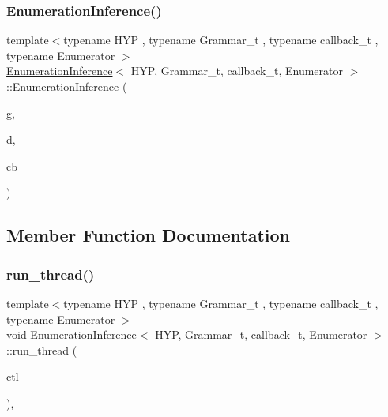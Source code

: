 \subsubsection{\texorpdfstring{Enumeration\+Inference()}{EnumerationInference()}}
{\footnotesize\ttfamily template$<$typename H\+YP , typename Grammar\+\_\+t , typename callback\+\_\+t , typename Enumerator $>$ \\
\hyperlink{class_enumeration_inference}{Enumeration\+Inference}$<$ H\+YP, Grammar\+\_\+t, callback\+\_\+t, Enumerator $>$\+::\hyperlink{class_enumeration_inference}{Enumeration\+Inference} (\begin{DoxyParamCaption}\item[{Grammar\+\_\+t $\ast$}]{g,  }\item[{typename H\+Y\+P\+::data\+\_\+t $\ast$}]{d,  }\item[{callback\+\_\+t \&}]{cb }\end{DoxyParamCaption})\hspace{0.3cm}{\ttfamily [inline]}}



\subsection{Member Function Documentation}
\mbox{\label{class_enumeration_inference_a128e8af05312e3a4a537e90ceb45c5ba}} 
\subsubsection{\texorpdfstring{run\+\_\+thread()}{run\_thread()}}
{\footnotesize\ttfamily template$<$typename H\+YP , typename Grammar\+\_\+t , typename callback\+\_\+t , typename Enumerator $>$ \\
void \hyperlink{class_enumeration_inference}{Enumeration\+Inference}$<$ H\+YP, Grammar\+\_\+t, callback\+\_\+t, Enumerator $>$\+::run\+\_\+thread (\begin{DoxyParamCaption}\item[{\hyperlink{struct_control}{Control}}]{ctl }\end{DoxyParamCaption})\hspace{0.3cm}{\ttfamily [inline]}, {\ttfamily [override]}}




